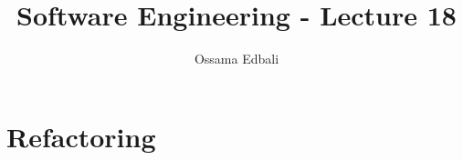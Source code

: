 \documentclass{article}
\title{Software Engineering - Lecture 18}
\author{Ossama Edbali}
\begin{document}
	
	\maketitle
	
	\section*{Refactoring}
		
\end{document}
